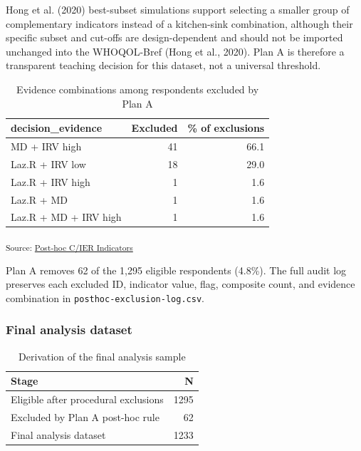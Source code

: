 \documentclass[
  letterpaper,
  DIV=11,
  numbers=noendperiod]{scrartcl}
\begin{document}
Hong et al. (2020) best-subset simulations support selecting a smaller
group of complementary indicators instead of a kitchen-sink combination,
although their specific subset and cut-offs are design-dependent and
should not be imported unchanged into the WHOQOL-Bref (Hong et al.,
2020). Plan A is therefore a transparent teaching decision for this
dataset, not a universal threshold.

{

\begin{longtable}[]{@{}lrr@{}}

\caption{\label{tbl-posthoc-exclusion-patterns}Evidence combinations
among respondents excluded by Plan A}

\tabularnewline

\toprule\noalign{}
decision\_evidence & Excluded & \% of exclusions \\
\midrule\noalign{}
\endhead
\bottomrule\noalign{}
\endlastfoot
MD + IRV high & 41 & 66.1 \\
Laz.R + IRV low & 18 & 29.0 \\
Laz.R + IRV high & 1 & 1.6 \\
Laz.R + MD & 1 & 1.6 \\
Laz.R + MD + IRV high & 1 & 1.6 \\

\end{longtable}

}

\textsubscript{Source:
\href{https://phdpablo.github.io/cier/Scripts/ProcessingScripts/02_posthoc-preview.html\#cell-tbl-posthoc-exclusion-patterns}{Post-hoc
C/IER Indicators}}

Plan A removes 62 of the 1,295 eligible respondents (4.8\%). The full
audit log preserves each excluded ID, indicator value, flag, composite
count, and evidence combination in \texttt{posthoc-exclusion-log.csv}.

\subsubsection{Final analysis dataset}\label{final-analysis-dataset}

{

\begin{longtable}[]{@{}lr@{}}

\caption{\label{tbl-analysis-sample-summary}Derivation of the final
analysis sample}

\tabularnewline

\toprule\noalign{}
Stage & N \\
\midrule\noalign{}
\endhead
\bottomrule\noalign{}
\endlastfoot
Eligible after procedural exclusions & 1295 \\
Excluded by Plan A post-hoc rule & 62 \\
Final analysis dataset & 1233 \\

\end{longtable}

}
\end{document}
